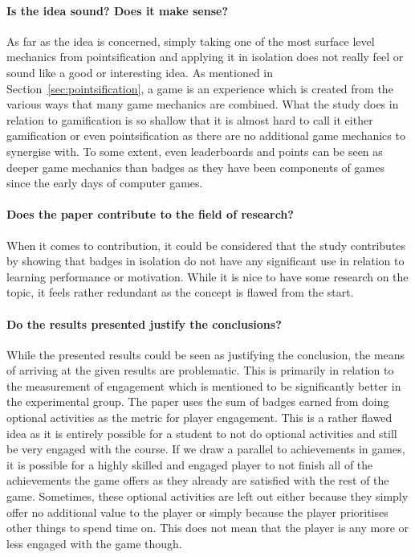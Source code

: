 \paragraph{Is the idea sound? Does it make sense?}
As far as the idea is concerned, simply taking one of the most surface level mechanics from pointsification and applying it in isolation does not really feel or sound like a good or interesting idea. As mentioned in Section~\ref{sec:pointsification}, a game is an experience which is created from the various ways that many game mechanics are combined. What the study does in relation to gamification is so shallow that it is almost hard to call it either gamification or even pointsification as there are no additional game mechanics to synergise with. To some extent, even leaderboards and points can be seen as deeper game mechanics than badges as they have been components of games since the early days of computer games. 

\paragraph{Does the paper contribute to the field of research?}
When it comes to contribution, it could be considered that the study contributes by showing that badges in isolation do not have any significant use in relation to learning performance or motivation. While it is nice to have some research on the topic, it feels rather redundant as the concept is flawed from the start. 

\paragraph{Do the results presented justify the conclusions?} 
While the presented results could be seen as justifying the conclusion, the means of arriving at the given results are problematic. This is primarily in relation to the measurement of engagement which is mentioned to be significantly better in the experimental group. The paper uses the sum of badges earned from doing optional activities as the metric for player engagement. This is a rather flawed idea as it is entirely possible for a student to not do optional activities and still be very engaged with the course. If we draw a parallel to achievements in games, it is possible for a highly skilled and engaged player to not finish all of the achievements the game offers as they already are satisfied with the rest of the game. Sometimes, these optional activities are left out either because they simply offer no additional value to the player or simply because the player prioritises other things to spend time on. This does not mean that the player is any more or less engaged with the game though. 

